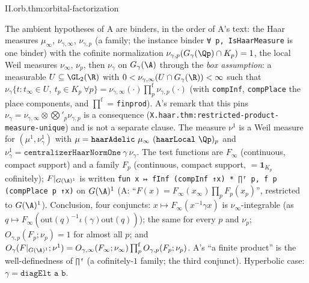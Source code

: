 \begin{tfformal}{II.orb.thm:orbital-factorization}
\begin{tffidelity}
The ambient hypotheses of A are binders, in the order of A's text: the Haar measures $\mu_\infty$, $\nu_{\gamma,\infty}$, $\nu_{\gamma,p}$ (a family; the instance binder \texttt{∀ p, IsHaarMeasure} is one binder) with the cofinite normalization $\nu_{\gamma,p}(G_\gamma(\Qp)\cap K_p)=1$, the local Weil measures $\nu_\infty$, $\nu_p$, then $\nu_\gamma$ on $G_\gamma(\A)$ through the \emph{box assumption}: a measurable $U\subseteq\GL_2(\R)$ with $0<\nu_{\gamma,\infty}(U\cap G_\gamma(\R))<\infty$ such that $\nu_\gamma\{t:t_\infty\in U,\ t_p\in K_p\ \forall p\}=\nu_{\gamma,\infty}(\cdot)\prod^{\mathrm f}_p\nu_{\gamma,p}(\cdot)$ (with \texttt{compInf}, \texttt{compPlace} the place components, and $\prod^{\mathrm f}$ = \texttt{finprod}). A's remark that this pins $\nu_\gamma=\nu_{\gamma,\infty}\otimes\bigotimes'_p\nu_{\gamma,p}$ is a consequence (\texttt{X.haar.thm:restricted-product-measure-unique}) and is not a separate clause. The measure $\nu^1$ is a Weil measure for $(\mu^1,\nu_\gamma^1)$ with $\mu=\texttt{haarAdelic}\ \mu_\infty\ (\texttt{haarLocal}\ \Qp)_p$ and $\nu^1_\gamma=\texttt{centralizerHaarNormOne}\ \gamma\ \nu_\gamma$. The test functions are $F_\infty$ (continuous, compact support) and a family $F_p$ (continuous, compact support, $=\mathbf 1_{K_p}$ cofinitely); $F|_{G(\A)^1}$ is written \texttt{fun x ↦ fInf (compInf ↑x) * ∏ᶠ p, f p (compPlace p ↑x)} on $G(\A)^1$ (A: ``$F(x)=F_\infty(x_\infty)\prod_pF_p(x_p)$'', restricted to $G(\A)^1$). Conclusion, four conjuncts: $x\mapsto F_\infty(x^{-1}\gamma x)$ is $\nu_\infty$-integrable (as $q\mapsto F_\infty(\mathrm{out}(q)^{-1}\iota(\gamma)\mathrm{out}(q))$); the same for every $p$ and $\nu_p$; $O_{\gamma,p}(F_p;\nu_p)=1$ for almost all $p$; and $O_\gamma(F|_{G(\A)^1};\nu^1)=O_{\gamma,\infty}(F_\infty;\nu_\infty)\prod^{\mathrm f}_pO_{\gamma,p}(F_p;\nu_p)$. A's ``a finite product'' is the well-definedness of \texttt{∏ᶠ} (a cofinitely-$1$ family; the third conjunct). Hyperbolic case: $\gamma=\texttt{diagElt a b}$.
\end{tffidelity}
\end{tfformal}

